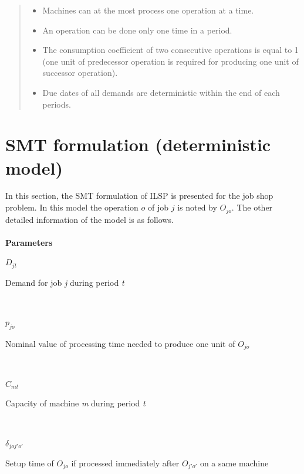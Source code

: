 \documentclass[letterpaper]{article} %
\begin{document}
\begin{quote}
\begin{itemize}
\item Machines can at the most process one operation at a time.
\item An operation can be done only one time in a period.
\item The consumption coefficient of two consecutive operations is equal to 1 (one unit of predecessor operation is required for producing one unit of successor operation).
\item Due dates of all demands are deterministic within the end of each periods.
\end{itemize}
\end{quote}

\section{SMT formulation (deterministic model)}
In this section, the SMT formulation of ILSP is presented for the job shop problem. In this model the operation $o$ of job $j$ is noted by \textit{$O_{jo}$}. The other detailed information of the model is as follows.\\\\

\textbf{Parameters}\\
\parbox{30pt}{\textit{$D_{jt}$}} 
\parbox[t]{207pt}{Demand for job \textit{j} during period \textit{t}}\\
\parbox{30pt}{\textit{$p_{jo}$}} 
\parbox[t]{207pt}{Nominal value of processing time needed to produce one unit of $O_{jo}$}\\
\parbox{30pt}{\textit{$C_{mt}$}} 
\parbox[t]{207pt}{Capacity of machine \textit{m} during period \textit{t}}\\
\parbox{30pt}{\textit{$\delta_{joj'o'}$}} 
\parbox[t]{207pt}{Setup time of $O_{jo}$ if processed immediately after $O_{j'o'}$ on a same machine}\\
\end{document}
